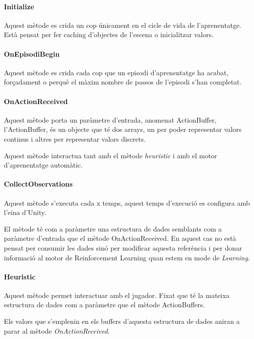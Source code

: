 \documentclass{article}
\begin{document}
    \newpage
    
    \paragraph{Initialize}
    Aquest mètode es crida un cop únicament en el cicle de vida de l'aprenentatge. Està pensat per fer caching d'objectes de l'escena o inicialitzar valors.
    
    \paragraph{OnEpisodiBegin}
    Aquest mètode es crida cada cop que un episodi d'aprenentatge ha acabat, forçadament o perquè el màxim nombre de passos de l'episodi s'han completat.
    
    \paragraph{OnActionReceived}
    Aquest mètode porta un paràmetre d'entrada, anomenat ActionBuffer, l'ActionBuffer, és un objecte que té dos arrays, un per poder representar valors continus i altres per representar valors discrets.
    
    Aquest mètode interactua tant amb el mètode \textit{heuristic} i amb el motor d'aprenentatge automàtic.
    
    \paragraph{CollectObservations}
    Aquest mètode s'executa cada x temps, aquest temps d'execució es configura amb l'eina d'Unity.
    
    El mètode té com a paràmetre una estructura de dades semblants com a paràmetre d'entrada que el mètode OnActionReceived. En aquest cas no està pensat per consumir les dades sinó per modificar aquesta referència i per donar informació al motor de Reinforcement Learning quan estem en mode de \textit{Learning}.


    \paragraph{Heuristic}
    Aquest mètode permet interactuar amb el jugador. Fixat que té la mateixa estructura de dades com a paràmetre que el mètode ActionBuffers.
    
    Els valors que s'emplenin en els buffers d'aquesta estructura de dades aniran a parar al mètode \textit{OnActionReceived}.
        
\end{document}
